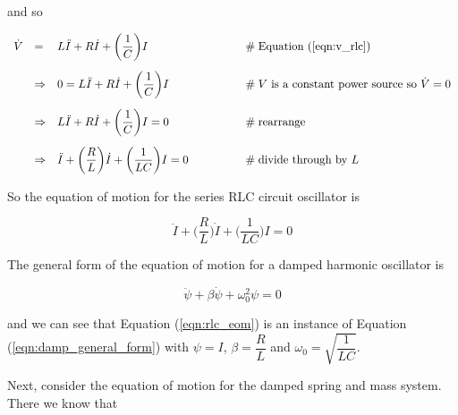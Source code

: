 \documentclass{article}
\theoremstyle{definition}
\begin{document}
\medskip
\noindent
and so

\begin{equation*}
\begin{array}{llll}
\dot{V}
&=& L \ddot{I} + R \dot{I} + \bigg (\dfrac{1}{C} \bigg ) I
		&\qquad \qquad \mathrel{\#} \text{Equation (\ref{eqn:v_rlc})} \\
[15pt]
&\Rightarrow& 0 = L \ddot{I} + R \dot{I} + \bigg (\dfrac{1}{C} \bigg ) I
		&\qquad \qquad \mathrel{\#} \text{$V$ is a constant power source so $\dot{V} = 0$} \\
[15pt]
&\Rightarrow& L \ddot{I} + R \dot{I} + \bigg (\dfrac{1}{C} \bigg ) I = 0
		&\qquad \qquad \mathrel{\#} \text{rearrange} \\
[15pt]
&\Rightarrow& \ddot{I} + \bigg (\dfrac{R}{L} \bigg ) \dot{I} + \bigg (\dfrac{1}{LC} \bigg ) I = 0
		&\qquad \qquad \mathrel{\#} \text{divide through by $L$}

\end{array}
\end{equation*}

\bigskip
\noindent
So the equation of motion for the series RLC circuit oscillator
is 

\medskip
\begin{equation}
\ddot{I} + \bigg (\dfrac{R}{L} \bigg ) \dot{I} + \bigg (\dfrac{1}{LC} \bigg ) I = 0
\label{eqn:rlc_eom}
\end{equation}

\bigskip
\noindent
The general form of the equation of motion for a damped harmonic
oscillator is

\medskip
\begin{equation}
\ddot{\psi} + \beta \dot{\psi} + \omega_{0}^{2} \psi = 0
\label{eqn:damp_general_form}
\end{equation}

\medskip
\noindent
and we can see that Equation (\ref{eqn:rlc_eom}) is an instance
of Equation (\ref{eqn:damp_general_form}) with $\psi = I$, $\beta
= \dfrac{R}{L}$ and $\omega_{0} = \sqrt{\dfrac{1}{LC}}$.


\bigskip
\noindent
Next, consider the equation of motion for the damped spring and
mass system. There we know that
\end{document}
